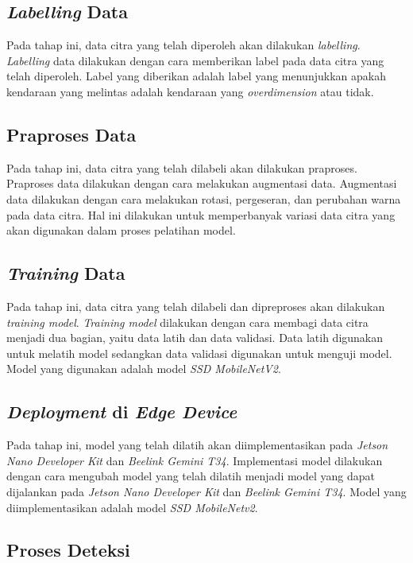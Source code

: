 \subsection{\emph{Labelling} Data}

Pada tahap ini, data citra yang telah diperoleh akan dilakukan \emph{labelling}. \emph{Labelling} data dilakukan dengan cara memberikan label pada data citra yang telah diperoleh. Label yang diberikan adalah label yang menunjukkan apakah kendaraan yang melintas adalah kendaraan yang \emph{overdimension} atau tidak.

\subsection{Praproses Data}

Pada tahap ini, data citra yang telah dilabeli akan dilakukan praproses. Praproses data dilakukan dengan cara melakukan augmentasi data. Augmentasi data dilakukan dengan cara melakukan rotasi, pergeseran, dan perubahan warna pada data citra. Hal ini dilakukan untuk memperbanyak variasi data citra yang akan digunakan dalam proses pelatihan model.

\subsection{\emph{Training} Data}

Pada tahap ini, data citra yang telah dilabeli dan dipreproses akan dilakukan \emph{training model}. \emph{Training model} dilakukan dengan cara membagi data citra menjadi dua bagian, yaitu data latih dan data validasi. Data latih digunakan untuk melatih model sedangkan data validasi digunakan untuk menguji model. Model yang digunakan adalah model \emph{SSD MobileNetV2}.

\subsection{\emph{Deployment} di \emph{Edge Device}}

Pada tahap ini, model yang telah dilatih akan diimplementasikan pada \emph{Jetson Nano Developer Kit} dan \emph{Beelink Gemini T34}. Implementasi model dilakukan dengan cara mengubah model yang telah dilatih menjadi model yang dapat dijalankan pada \emph{Jetson Nano Developer Kit} dan \emph{Beelink Gemini T34}. Model yang diimplementasikan adalah model \emph{SSD MobileNetv2}.

\subsection{Proses Deteksi}

